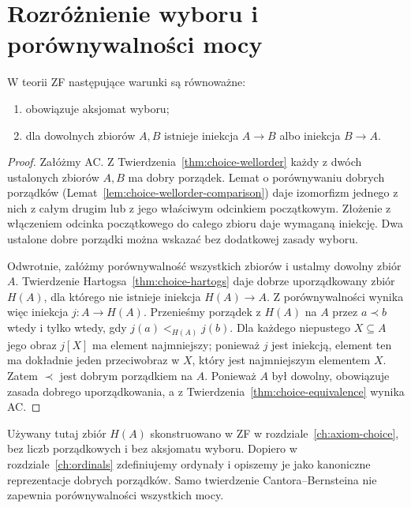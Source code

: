 \section{Rozróżnienie wyboru i porównywalności mocy}
\begin{twierdzenie}
\label{thm:card-comparability-choice}
W teorii ZF następujące warunki są równoważne:
\begin{enumerate}[label=(\roman*)]
\item obowiązuje aksjomat wyboru;
\item dla dowolnych zbiorów $A,B$ istnieje
iniekcja $A\to B$ albo iniekcja $B\to A$.
\end{enumerate}
\end{twierdzenie}
\begin{proof}
Załóżmy AC. Z Twierdzenia~\ref{thm:choice-wellorder}
każdy z dwóch ustalonych zbiorów $A,B$
ma dobry porządek. Lemat o porównywaniu dobrych
porządków (Lemat~\ref{lem:choice-wellorder-comparison})
daje izomorfizm jednego z nich z całym drugim
lub z jego właściwym odcinkiem początkowym.
Złożenie z włączeniem odcinka początkowego
do całego zbioru daje wymaganą iniekcję.
Dwa ustalone dobre porządki można wskazać
bez dodatkowej zasady wyboru.

Odwrotnie, załóżmy porównywalność wszystkich
zbiorów i ustalmy dowolny zbiór $A$.
Twierdzenie Hartogsa~\ref{thm:choice-hartogs}
daje dobrze uporządkowany zbiór $H(A)$,
dla którego nie istnieje iniekcja $H(A)\to A$.
Z porównywalności wynika więc iniekcja
$j:A\to H(A)$. Przenieśmy porządek z $H(A)$
na $A$ przez
$a\prec b$ wtedy i tylko wtedy, gdy
$j(a)<_{H(A)}j(b)$.
Dla każdego niepustego $X\subseteq A$
jego obraz $j[X]$ ma element najmniejszy;
ponieważ $j$ jest iniekcją, element ten ma
dokładnie jeden przeciwobraz w $X$, który
jest najmniejszym elementem $X$.
Zatem $\prec$ jest dobrym porządkiem na $A$.
Ponieważ $A$ był dowolny, obowiązuje zasada
dobrego uporządkowania, a z
Twierdzenia~\ref{thm:choice-equivalence}
wynika AC.
\end{proof}
\begin{uwaga}
\label{rem:card-no-circular-choice}
Używany tutaj zbiór $H(A)$ skonstruowano w ZF
w rozdziale~\ref{ch:axiom-choice}, bez
liczb porządkowych i bez aksjomatu wyboru.
Dopiero w rozdziale~\ref{ch:ordinals}
zdefiniujemy ordynały i opiszemy je
jako kanoniczne reprezentacje dobrych porządków.
Samo twierdzenie Cantora--Bernsteina
nie zapewnia porównywalności wszystkich mocy.
\end{uwaga}
